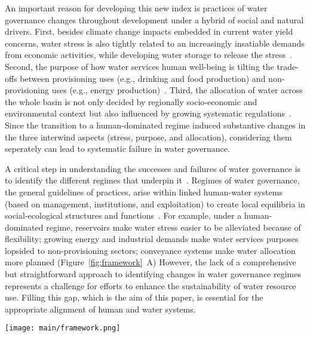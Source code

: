 An important reason for developing this new index is practices of water governance changes throughout development under a hybrid of social and natural drivers.
First, besides climate change impacts embedded in current water yield concerns, water stress is also tightly related to an increasingly insatiable demands from economic activities, while developing water storage to release the stress~\cite{qin2019,wada2014,huang2021}.
Second, the purpose of how water services human well-being is tilting the trade-offs between provisioning uses (e.g., drinking and food production) and non-provisioning uses (e.g., energy production)~\cite{liu2017,florke2018,jaeger2019}.
Third, the allocation of water across the whole basin is not only decided by regionally socio-economic and environmental context but also influenced by growing systematic regulations~\cite{schmandt2021,speed2013}.
Since the transition to a human-dominated regime induced substantive changes in the three interwind aspects (stress, purpose, and allocation), considering them seperately can lead to systematic failure in water governance.

A critical step in understanding the successes and failures of water governance is to identify the different regimes that underpin it~\cite{kjellen2015, grafton2013}.
Regimes of water governance, the general guidelines of practices, arise within linked human-water systems (based on management, institutions, and exploitation) to create local equilibria in social-ecological structures and functions~\cite{falkenmark2021,bressers2013,loch2020,pahl-wostl2007}.
For example, under a human-dominated regime, reservoirs make water stress easier to be alleviated because of flexibility; growing energy and industrial demands make water services purposes lopsided to non-provisioning sectors; conveyance systems make water allocation more planned (Figure~\ref{fig:framework}~A)
However, the lack of a comprehensive but straightforward approach to identifying changes in water governance regimes represents a challenge for efforts to enhance the sustainability of water resource use.
Filling this gap, which is the aim of this paper, is essential for the appropriate alignment of human and water systems.


\begin{figure*}[!ht]
	\centerline{
		\texttt{[image: main/framework.png]}
	}
	\caption{
		Identifying the water governance regimes in transitions of a hydrosocial cycle with an integrated water governance index (IWGI). Water stress (S), purposes of water services (P), and water allocation (A) are three aspects to be considered (\textbf{A.}). Along with hydrosocial-cycle transitions, a human-dominated regime influences these aspects of water governance. For example, the construction of reservoirs (1) aims to alleviate water stress; growth of energy and industry (2); water-lead intensive agriculture (3); conveyance system (4) controls water allocation.
		Therefore, the methodology is to combine three aspects' corresponding indicators, and then an abrupt change of the IWGI can indicate a regime shift in water governance (\textbf{B.}).
	}\label{fig:framework}
\end{figure*}


